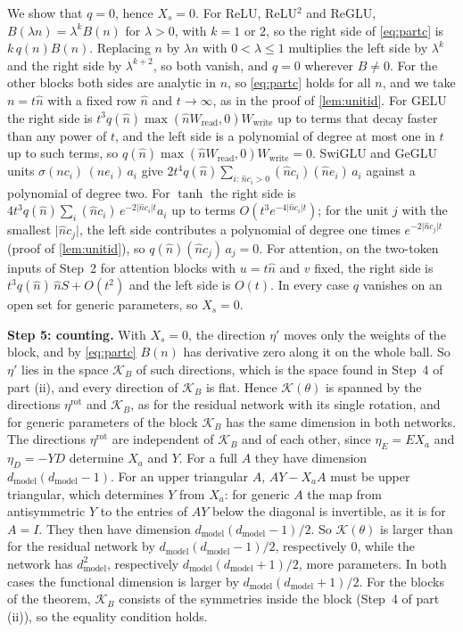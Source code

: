 \documentclass[10pt]{article}
\theoremstyle{definition}
\theoremstyle{remark}
\newcommand{\Wread}{W_{\mathrm{read}}}
\newcommand{\Wwrite}{W_{\mathrm{write}}}
\newcommand{\dm}{d_{\mathrm{model}}}
\newcommand{\para}[1]{\smallskip\noindent\textbf{#1}\hspace{0.5em}}
\begin{document}
We show that $q = 0$, hence $X_s = 0$. For ReLU, ReLU$^2$ and ReGLU, $B(\lambda n) = \lambda^kB(n)$ for $\lambda > 0$, with $k = 1$ or $2$, so the right side of \cref{eq:partc} is $k\,q(n)B(n)$. Replacing $n$ by $\lambda n$ with $0 < \lambda \le 1$ multiplies the left side by $\lambda^k$ and the right side by $\lambda^{k+2}$, so both vanish, and $q = 0$ wherever $B \neq 0$. For the other blocks both sides are analytic in $n$, so \cref{eq:partc} holds for all $n$, and we take $n = t\hat n$ with a fixed row $\hat n$ and $t \to \infty$, as in the proof of \cref{lem:unitid}. For GELU the right side is $t^3q(\hat n)\max(\hat n\Wread, 0)\Wwrite$ up to terms that decay faster than any power of $t$, and the left side is a polynomial of degree at most one in $t$ up to such terms, so $q(\hat n)\max(\hat n\Wread, 0)\Wwrite = 0$. SwiGLU and GeGLU units $\sigma(nc_i)\,(ne_i)\,a_i$ give $2t^4q(\hat n)\sum_{i:\,\hat nc_i > 0}(\hat nc_i)(\hat ne_i)\,a_i$ against a polynomial of degree two. For $\tanh$ the right side is $4t^3q(\hat n)\sum_i (\hat nc_i)\,e^{-2\lvert \hat nc_i\rvert t}a_i$ up to terms $O(t^3e^{-4\lvert \hat nc_i\rvert t})$; for the unit $j$ with the smallest $\lvert \hat nc_j\rvert$, the left side contributes a polynomial of degree one times $e^{-2\lvert \hat nc_j\rvert t}$ (proof of \cref{lem:unitid}), so $q(\hat n)(\hat nc_j)\,a_j = 0$. For attention, on the two-token inputs of Step~2 for attention blocks with $u = t\hat n$ and $v$ fixed, the right side is $t^3q(\hat n)\,\hat nS + O(t^2)$ and the left side is $O(t)$. In every case $q$ vanishes on an open set for generic parameters, so $X_s = 0$.

\para{Step 5: counting.} With $X_s = 0$, the direction $\eta'$ moves only the weights of the block, and by \cref{eq:partc} $B(n)$ has derivative zero along it on the whole ball. So $\eta'$ lies in the space $\mathcal K_B$ of such directions, which is the space found in Step~4 of part (ii), and every direction of $\mathcal K_B$ is flat. Hence $\mathcal K(\theta)$ is spanned by the directions $\eta^{\mathrm{rot}}$ and $\mathcal K_B$, as for the residual network with its single rotation, and for generic parameters of the block $\mathcal K_B$ has the same dimension in both networks. The directions $\eta^{\mathrm{rot}}$ are independent of $\mathcal K_B$ and of each other, since $\eta_E = EX_a$ and $\eta_D = -YD$ determine $X_a$ and $Y$. For a full $A$ they have dimension $\dm(\dm-1)$. For an upper triangular $A$, $AY - X_aA$ must be upper triangular, which determines $Y$ from $X_a$: for generic $A$ the map from antisymmetric $Y$ to the entries of $AY$ below the diagonal is invertible, as it is for $A = I$. They then have dimension $\dm(\dm-1)/2$. So $\mathcal K(\theta)$ is larger than for the residual network by $\dm(\dm-1)/2$, respectively $0$, while the network has $\dm^2$, respectively $\dm(\dm+1)/2$, more parameters. In both cases the functional dimension is larger by $\dm(\dm+1)/2$. For the blocks of the theorem, $\mathcal K_B$ consists of the symmetries inside the block (Step~4 of part (ii)), so the equality condition holds.
\end{document}

